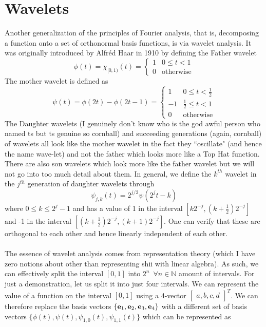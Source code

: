 \documentclass{report}
\theoremstyle{definition}
\theoremstyle{remark}
\begin{document}
\section{Wavelets}
Another generalization of the principles of Fourier analysis, that is, decomposing a function onto a set of orthonormal basis functions, is via wavelet analysis. It was originally introduced by Alfr\'ed Haar in 1910 by defining the Father wavelet
\begin{equation*}
    \phi(t)=\chi_{[0,1)}(t)=\begin{cases}
        1 &0\leq t < 1\\ 0 &\text{otherwise}
    \end{cases}
\end{equation*}
The mother wavelet is defined as \begin{equation*}
    \psi (t)=\phi(2t)-\phi(2t-1) = \begin{cases}
        1 &0\leq t < \frac{1}{2}\\ -1 &\frac{1}{2}\leq t<1\\0 & \text{otherwise}
    \end{cases}
\end{equation*}
The Daughter wavelets (I genuinely don't know who is the god awful person who named ts but ts genuine so cornball) and succeeding generations (again, cornball) of wavelets all look like the mother wavelet in the fact they ``oscillate" (and hence the name wave-let) and not the father which looks more like a Top Hat function. There are also son wavelets which look more like the father wavelet but we will not go into too much detail about them. In general, we define the $k^{th}$ wavelet in the $j^{th}$ generation of daughter wavelets through 
\begin{equation*}
    \psi_{j,k}(t)=2^{j/2}\psi(2^jt-k)
\end{equation*}
where $0\leq k\leq 2^j-1$ and has a value of 1 in the interval $[k2^{-j},(k+\frac{1}{2})2^{-j}]$ and -1 in the interval $[(k+\frac{1}{2})2^{-j},(k+1)2^{-j}]$. One can verify that these are orthogonal to each other and hence linearly independent of each other.
\\\\The essence of wavelet analysis comes from representation theory (which I have zero notions about other than representing shii with linear algebra). As such, we can effectively split the interval $[0,1]$ into $2^n \,\,\,\forall n\in \mathbb{N}$ amount of intervals. For just a demonstration, let us split it into just four intervals. We can represent the value of a function on the interval $[0,1]$ using a 4-vector $\begin{bmatrix}a,b,c,d\end{bmatrix}^T$. We can therefore replace the basis vectors $\{ \bold{e}_1,\bold{e}_2,\bold{e}_3,\bold{e}_4\}$ with a different set of basis vectors $\{\phi(t),\psi(t),\psi_{1,0}(t),\psi_{1,1}(t)\}$ which can be represented as 
\end{document}
